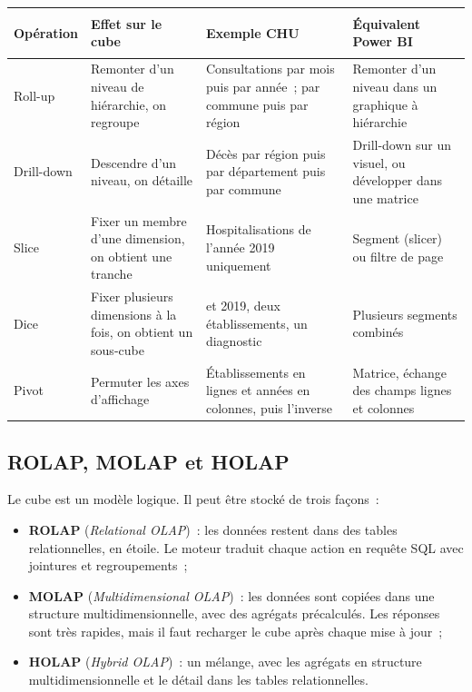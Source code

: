 \begin{center}
\small
\begin{tabularx}{\textwidth}{>{\bfseries\raggedright\arraybackslash}p{2.2cm} >{\raggedright\arraybackslash}X >{\raggedright\arraybackslash}X >{\raggedright\arraybackslash}X}
\toprule
Opération & Effet sur le cube & Exemple CHU & Équivalent Power BI \\
\midrule
Roll-up & Remonter d'un niveau de hiérarchie, on regroupe & Consultations par mois puis par année~; par commune puis par région & Remonter d'un niveau dans un graphique à hiérarchie \\
Drill-down & Descendre d'un niveau, on détaille & Décès par région puis par département puis par commune & Drill-down sur un visuel, ou développer dans une matrice \\
Slice & Fixer un membre d'une dimension, on obtient une tranche & Hospitalisations de l'année 2019 uniquement & Segment (slicer) ou filtre de page \\
Dice & Fixer plusieurs dimensions à la fois, on obtient un sous-cube & 2018 et 2019, deux établissements, un diagnostic & Plusieurs segments combinés \\
Pivot & Permuter les axes d'affichage & Établissements en lignes et années en colonnes, puis l'inverse & Matrice, échange des champs lignes et colonnes \\
\bottomrule
\end{tabularx}
\end{center}

\subsection{ROLAP, MOLAP et HOLAP}

\noindent Le cube est un modèle logique. Il peut être stocké de trois façons~:
\begin{itemize}
	\item \textbf{ROLAP} (\textit{Relational OLAP})~: les données restent dans des tables relationnelles, en étoile. Le moteur traduit chaque action en requête SQL avec jointures et regroupements~;
	\item \textbf{MOLAP} (\textit{Multidimensional OLAP})~: les données sont copiées dans une structure multidimensionnelle, avec des agrégats précalculés. Les réponses sont très rapides, mais il faut recharger le cube après chaque mise à jour~;
	\item \textbf{HOLAP} (\textit{Hybrid OLAP})~: un mélange, avec les agrégats en structure multidimensionnelle et le détail dans les tables relationnelles.
\end{itemize}

